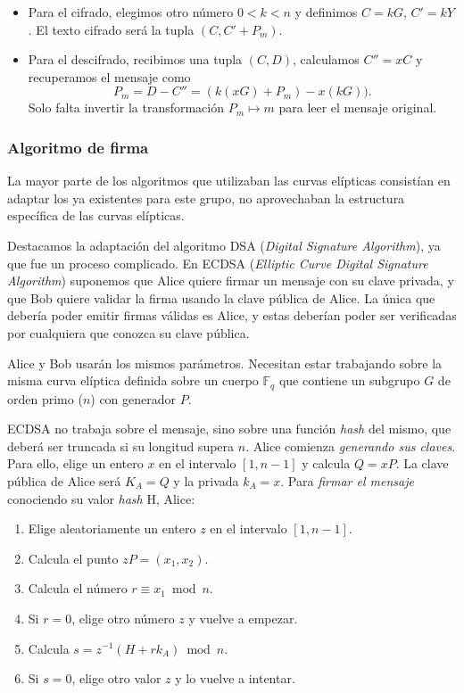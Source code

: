 \documentclass[
  a4paper,
  12pt,
  spanish,
]{scrartcl}
\begin{document}
\begin{itemize}
	\item Para el cifrado, elegimos otro número $0 < k < n$ y definimos $C =kG$, $C' = kY$. El texto cifrado será la tupla $(C, C' + P_m)$.
	\item Para el descifrado, recibimos una tupla $(C, D)$, calculamos $C'' = xC$ y recuperamos el mensaje como \[ P_m = D - C'' = (k(xG) + P_m) - x(kG)). \] Solo falta invertir la transformación $P_m \mapsto m$ para leer el mensaje original.
\end{itemize}

\subsubsection{Algoritmo de firma}

La mayor parte de los algoritmos que utilizaban las curvas elípticas consistían en adaptar los ya existentes para este grupo, no aprovechaban la estructura específica de las curvas elípticas.

Destacamos la adaptación del algoritmo DSA (\textit{Digital Signature Algorithm}), ya que fue un proceso complicado. En ECDSA (\textit{Elliptic Curve Digital Signature Algorithm}) suponemos que Alice quiere firmar un mensaje con su clave privada, y que Bob quiere validar la firma usando la clave pública de Alice. La única que debería poder emitir firmas válidas es Alice, y estas deberían poder ser verificadas por cualquiera que conozca su clave pública.

Alice y Bob usarán los mismos parámetros. Necesitan estar trabajando sobre la misma curva elíptica definida sobre un cuerpo $\mathbb{F}_q$ que contiene un subgrupo $G$ de orden primo ($n$) con generador $P$.

ECDSA no trabaja sobre el mensaje, sino sobre una función \textit{hash} del mismo, que deberá ser truncada si su longitud supera $n$. Alice comienza \textit{generando sus claves}. Para ello, elige un entero $x$ en el intervalo $[1,n-1]$ y calcula $Q=xP$. La clave pública de Alice será $K_A=Q$ y la privada $k_A=x$. Para \textit{firmar el mensaje} conociendo su valor \textit{hash} H, Alice:

\begin{enumerate}
\item Elige aleatoriamente un entero $z$ en el intervalo $[1,n-1]$.
\item Calcula el punto $zP =(x_1,x_2)$.
\item Calcula el número $r \equiv x_1 \bmod n$.
\item Si $r=0$, elige otro número $z$ y vuelve a empezar.
\item Calcula $s=z^{-1}(H+rk_A)\bmod n$. \label{en:s}
\item Si $s=0$, elige otro valor $z$ y lo vuelve a intentar.
\end{enumerate}
\end{document}
